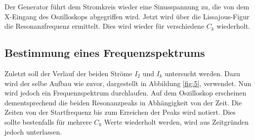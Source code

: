 Der Generator führt dem Stromkreis wieder eine Sinusspannung zu, die von dem X-Eingang des Oszilloskops abgegriffen wird.
Jetzt wird über die Lissajous-Figur die Resonanzfrequenz ermittelt.
Dies wird wieder für verschiedene $C_k$ wiederholt.\\
\subsection{Bestimmung eines Frequenzspektrums}
\label{sec:d3}
Zuletzt soll der Verlauf der beiden Ströme $I_2$ und $I_k$ untersucht werden.
Dazu wird der selbe Aufbau wie zuvor, dargestellt in Abbildung \ref{fig:5}, verwendet.
Nun wird jedoch ein Frequenzspektrum durchlaufen.
Auf dem Oszilloskop erscheinen dementsprechend die beiden Resonanzpeaks in Abhängigkeit von der Zeit.
Die Zeiten von der Startfrequenz bis zum Erreichen der Peaks wird notiert.
Dies sollte bestenfalls für mehrere $C_k$ Werte wiederholt werden, wird aus Zeitgründen jedoch unterlassen.
